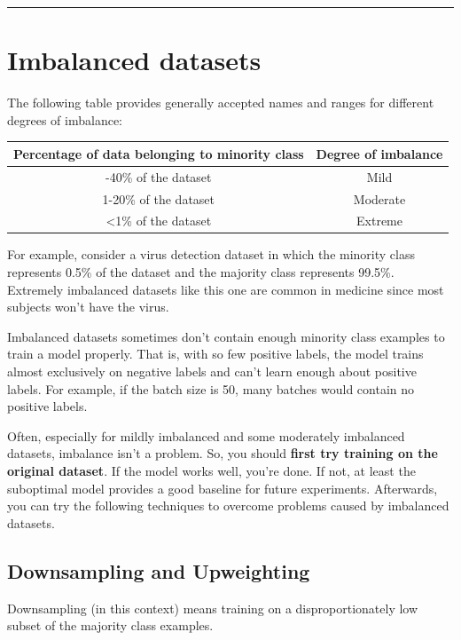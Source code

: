 \documentclass[
  a4paper,
  twoside,
  openright]{book}
\theoremstyle{definition}
\theoremstyle{definition}
\theoremstyle{definition}
\theoremstyle{definition}
\theoremstyle{remark}
\begin{document}
\begin{center}\rule{0.5\linewidth}{0.5pt}\end{center}

\section{Imbalanced datasets}\label{imbalanced-datasets}

The following table provides generally accepted names and ranges for different degrees of imbalance:

\begin{longtable}[]{@{}cc@{}}
\toprule\noalign{}
Percentage of data belonging to minority class & Degree of imbalance \\
\midrule\noalign{}
\endhead
\bottomrule\noalign{}
\endlastfoot
20-40\% of the dataset & Mild \\
1-20\% of the dataset & Moderate \\
\textless1\% of the dataset & Extreme \\
\end{longtable}

For example, consider a virus detection dataset in which the minority class represents 0.5\% of the dataset and the majority class represents 99.5\%. Extremely imbalanced datasets like this one are common in medicine since most subjects won't have the virus.

Imbalanced datasets sometimes don't contain enough minority class examples to train a model properly. That is, with so few positive labels, the model trains almost exclusively on negative labels and can't learn enough about positive labels. For example, if the batch size is 50, many batches would contain no positive labels.

Often, especially for mildly imbalanced and some moderately imbalanced datasets, imbalance isn't a problem. So, you should \textbf{first try training on the original dataset}. If the model works well, you're done. If not, at least the suboptimal model provides a good baseline for future experiments. Afterwards, you can try the following techniques to overcome problems caused by imbalanced datasets.

\subsection{Downsampling and Upweighting}\label{downsampling-and-upweighting}

Downsampling (in this context) means training on a disproportionately low subset of the majority class examples.
\end{document}
